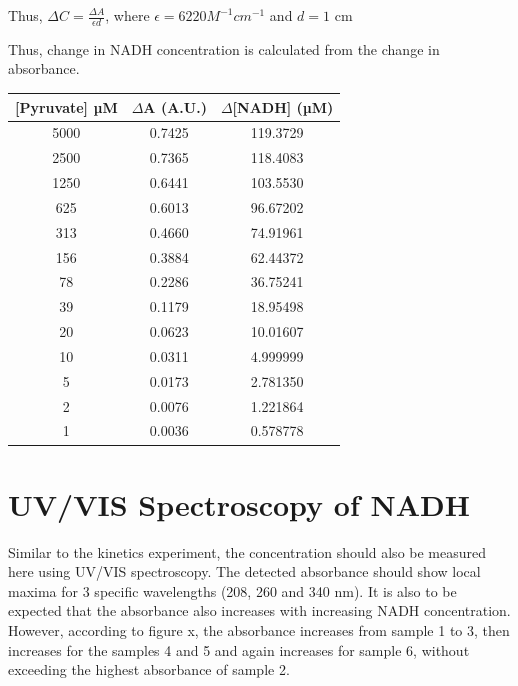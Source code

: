 \documentclass[a4paper,11pt]{article}
\begin{document}
                \begin{center}
                    Thus, $\Delta C = \frac{\Delta A}{\epsilon d}$,
                    where $\epsilon = 6220 M^{-1} cm^{-1}$ and $d = 1$ cm
                \end{center}
                
                Thus, change in NADH concentration is calculated from the change in absorbance.
                \begin{center}
                    \begin{tabular}{ c | c | c }
                        [Pyruvate] µM & $\Delta$A (A.U.) & $\Delta$[NADH] (µM) \\
                        \hline 
                        5000 & 0.7425 & 119.3729 \\
                        2500 & 0.7365 & 118.4083 \\
                        1250 & 0.6441 & 103.5530 \\
                         625 & 0.6013 & 96.67202 \\
                         313 & 0.4660 & 74.91961 \\
                         156 & 0.3884 & 62.44372 \\
                          78 & 0.2286 & 36.75241 \\
                          39 & 0.1179 & 18.95498 \\
                          20 & 0.0623 & 10.01607 \\
                          10 & 0.0311 & 4.999999 \\
                           5 & 0.0173 & 2.781350 \\
                           2 & 0.0076 & 1.221864 \\
                           1 & 0.0036 & 0.578778 \\
                    \end{tabular}
                \end{center}

    \pagebreak

    \section{UV/VIS Spectroscopy of NADH}
    Similar to the kinetics experiment, the concentration should also be measured here using UV/VIS spectroscopy.
    The detected absorbance should show local maxima for 3 specific wavelengths (208, 260 and 340 nm). It is also to be expected that the absorbance also increases with increasing NADH concentration. However, according to figure x, the absorbance increases from sample 1 to 3, then increases for the samples 4 and 5 and again increases for sample 6, without exceeding the highest absorbance of sample 2. 
\end{document}
